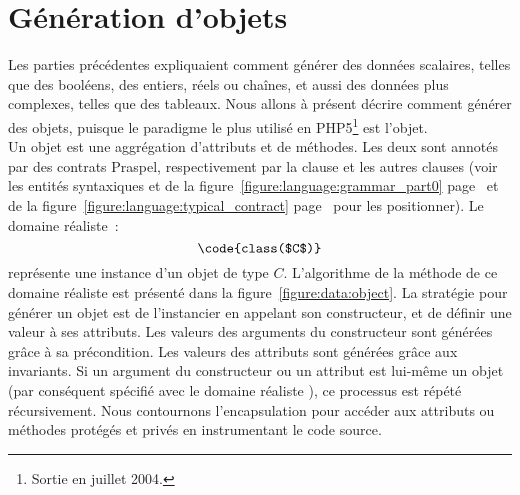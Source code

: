 \section{Génération d'objets}
\label{section:data:objects}

Les parties précédentes expliquaient comment générer des données scalaires,
telles que des booléens, des entiers, réels ou chaînes, et aussi des données
plus complexes, telles que des tableaux. Nous allons à présent décrire comment
générer des objets, puisque le paradigme le plus utilisé en PHP5\footnote{Sortie
en juillet 2004.} est l'objet. \\

Un objet est une aggrégation d'attributs et de méthodes. Les deux sont annotés
par des contrats Praspel, respectivement par la clause \ainvariant et les autres
clauses (voir les entités syntaxiques  et
 de la figure~\ref{figure:language:grammar_part0}
page~\pageref{figure:language:grammar_part0} et de la
figure~\ref{figure:language:typical_contract}
page~\pageref{figure:language:typical_contract} pour les positionner). Le
domaine réaliste~:
%
$$\code{class($C$)}$$
%
représente une instance d'un objet de type $C$. L'algorithme de la méthode
 de ce domaine réaliste est présenté dans la
figure~\ref{figure:data:object}.  La stratégie pour générer un objet est de
l'instancier en appelant son constructeur, et de définir une valeur à ses
attributs. Les valeurs des arguments du constructeur sont générées grâce à sa
précondition. Les valeurs des attributs sont générées grâce aux invariants. Si
un argument du constructeur ou un attribut est lui-même un objet (par conséquent
spécifié avec le domaine réaliste ), ce processus est répété
récursivement. Nous contournons l'encapsulation pour accéder aux attributs ou
méthodes protégés et privés en instrumentant le code source.

